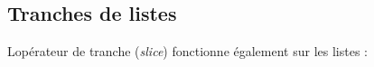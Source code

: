 \begin{Shaded}
\begin{Highlighting}[]
\OperatorTok{\textgreater{}\textgreater{}\textgreater{}}\NormalTok{ [}\NormalTok{] }\OperatorTok{*} 
\NormalTok{[}\NormalTok{, }\NormalTok{, }\NormalTok{, }\NormalTok{]}
\OperatorTok{\textgreater{}\textgreater{}\textgreater{}}\NormalTok{ [}\NormalTok{, }\NormalTok{, }\NormalTok{] }\OperatorTok{*} 
\NormalTok{[}\NormalTok{, }\NormalTok{, }\NormalTok{, }\NormalTok{, }\NormalTok{, }\NormalTok{]}
\end{Highlighting}
\end{Shaded}

\hypertarget{tranches-de-listes}{%
\subsection{Tranches de listes}\label{tranches-de-listes}}

L\textquotesingle opérateur de tranche (\emph{slice}) fonctionne
également sur les listes :

\begin{Shaded}
\begin{Highlighting}[]
\OperatorTok{\textgreater{}\textgreater{}\textgreater{}}\OperatorTok{=}\NormalTok{ [}\NormalTok{, }\NormalTok{, }\NormalTok{, }\NormalTok{, }\NormalTok{, }\NormalTok{]}
\OperatorTok{\textgreater{}\textgreater{}\textgreater{}}\NormalTok{ t[}\NormalTok{:}\NormalTok{]}
\NormalTok{[}\NormalTok{, }\NormalTok{]}
\OperatorTok{\textgreater{}\textgreater{}\textgreater{}}\NormalTok{ t[:}\NormalTok{]}
\NormalTok{[}\NormalTok{, }\NormalTok{, }\NormalTok{, }\NormalTok{]}
\OperatorTok{\textgreater{}\textgreater{}\textgreater{}}\NormalTok{ t[}\NormalTok{:]}
\NormalTok{[}\NormalTok{, }\NormalTok{, }\NormalTok{]}
\end{Highlighting}
\end{Shaded}

